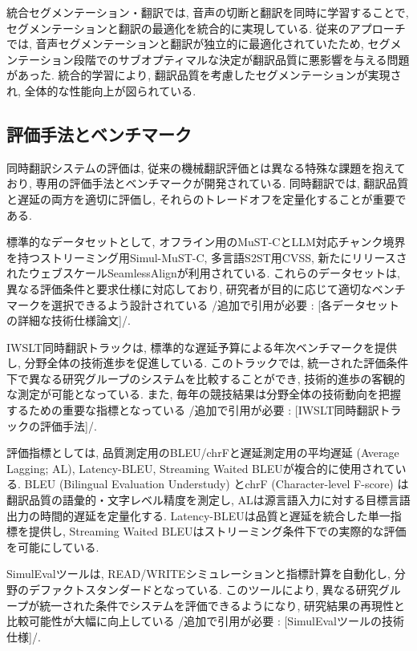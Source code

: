 統合セグメンテーション・翻訳では, 音声の切断と翻訳を同時に学習することで, セグメンテーションと翻訳の最適化を統合的に実現している.
従来のアプローチでは, 音声セグメンテーションと翻訳が独立的に最適化されていたため, セグメンテーション段階でのサブオプティマルな決定が翻訳品質に悪影響を与える問題があった.
統合的学習により, 翻訳品質を考慮したセグメンテーションが実現され, 全体的な性能向上が図られている.

\subsection{評価手法とベンチマーク}

同時翻訳システムの評価は, 従来の機械翻訳評価とは異なる特殊な課題を抱えており, 専用の評価手法とベンチマークが開発されている.
同時翻訳では, 翻訳品質と遅延の両方を適切に評価し, それらのトレードオフを定量化することが重要である.

標準的なデータセットとして, オフライン用のMuST-CとLLM対応チャンク境界を持つストリーミング用Simul-MuST-C, 多言語S2ST用CVSS, 新たにリリースされたウェブスケールSeamlessAlignが利用されている.
これらのデータセットは, 異なる評価条件と要求仕様に対応しており, 研究者が目的に応じて適切なベンチマークを選択できるよう設計されている {/追加で引用が必要 : [各データセットの詳細な技術仕様論文]/}.

IWSLT同時翻訳トラックは, 標準的な遅延予算による年次ベンチマークを提供し, 分野全体の技術進歩を促進している.
このトラックでは, 統一された評価条件下で異なる研究グループのシステムを比較することができ, 技術的進歩の客観的な測定が可能となっている.
また, 毎年の競技結果は分野全体の技術動向を把握するための重要な指標となっている {/追加で引用が必要 : [IWSLT同時翻訳トラックの評価手法]/}.

評価指標としては, 品質測定用のBLEU/chrFと遅延測定用の平均遅延 (Average Lagging; AL), Latency-BLEU, Streaming Waited BLEUが複合的に使用されている.
BLEU (Bilingual Evaluation Understudy) とchrF (Character-level F-score) は翻訳品質の語彙的・文字レベル精度を測定し, ALは源言語入力に対する目標言語出力の時間的遅延を定量化する.
Latency-BLEUは品質と遅延を統合した単一指標を提供し, Streaming Waited BLEUはストリーミング条件下での実際的な評価を可能にしている.

SimulEvalツールは, READ/WRITEシミュレーションと指標計算を自動化し, 分野のデファクトスタンダードとなっている.
このツールにより, 異なる研究グループが統一された条件でシステムを評価できるようになり, 研究結果の再現性と比較可能性が大幅に向上している {/追加で引用が必要 : [SimulEvalツールの技術仕様]/}.

